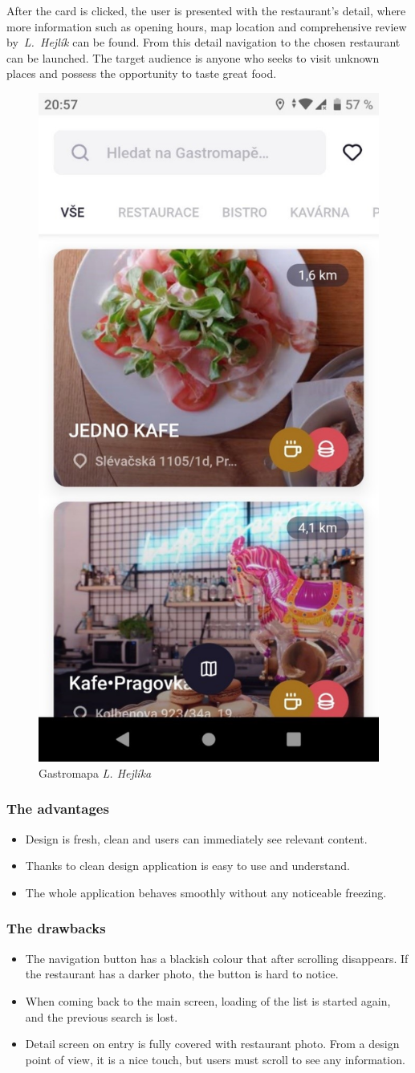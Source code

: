 After the card is clicked, the user is presented with the restaurant's detail, where more information such as opening hours, map location and comprehensive review by~\textit{L.~Hejlík} can be found. From this detail navigation to the chosen restaurant can be launched. The target audience is anyone who seeks to visit unknown places and possess the opportunity to taste great food.

\begin{figure}[ht]
    \centering
    \includegraphics[width=0.33\linewidth]{img/analysis/gastromapa_hejlik.jpg}
    \caption{Gastromapa \textit{L. Hejlíka} \cite{app-hejlik}}
    \label{fig:gastromapa-hejlik}
\end{figure}

\subsubsection{The advantages}
\begin{itemize}
    \item Design is fresh, clean and users can immediately see relevant content.
    \item Thanks to clean design application is easy to use and understand.
    \item The whole application behaves smoothly without any noticeable freezing.
\end{itemize}

\subsubsection{The drawbacks}
\begin{itemize}
    \item The navigation button has a blackish colour that after scrolling disappears. If the restaurant has a darker photo, the button is hard to notice. 
    \item When coming back to the main screen, loading of the list is started again, and the previous search is lost.
    \item Detail screen on entry is fully covered with restaurant photo. From a design point of view, it is a nice touch, but users must scroll to see any information. 
\end{itemize}

